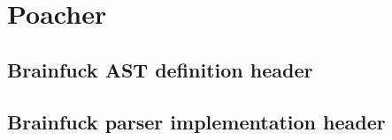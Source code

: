 \documentclass[../main]{subfiles}
\begin{document}
\section{
  Poacher
}

\subsection{
  Brainfuck AST definition header
}
\label{app:bf-ast}



\clearpage{} %

\subsection{
  Brainfuck parser implementation header
}
\label{app:bf-parser}


\end{document}
